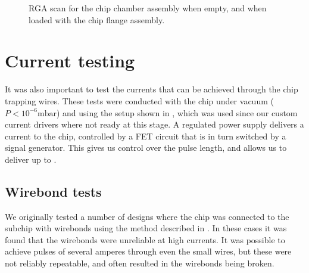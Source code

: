 \begin{figure}[h]
  \centering
  \caption{RGA scan for the chip chamber assembly when empty, and when loaded
  with the chip flange assembly.}
  \label{exper:fig:rga}
\end{figure}

\section{Current testing}

It was also important to test the currents that can be achieved through the
chip trapping wires. These tests were conducted with the chip under vacuum
($P<10^{-6}\si{\milli\bar}$) and using the setup shown in
, which was used since our custom current drivers
where not ready at this stage. A regulated power supply delivers a current to
the chip, controlled by a FET circuit that is in turn switched by a signal
generator. This gives us control over the pulse length, and allows us to
deliver up to .

\begin{figure}
  \centering
  \caption{}
  \label{exper:fig:curtest}
\end{figure}

\subsection{Wirebond tests}

We originally tested a number of designs where the chip was connected to the
subchip with wirebonds using the method described in . In these cases it was found that the wirebonds were unreliable at
high currents. It was possible to achieve pulses of several amperes through
even the small wires, but these were not reliably repeatable, and often
resulted in the wirebonds being broken.

